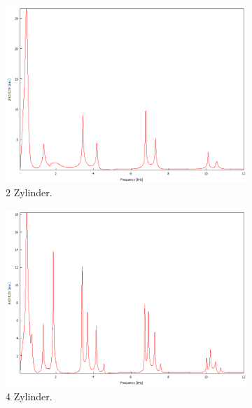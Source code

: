 \begin{figure}
    \centering
    \begin{subfigure}[b]{0.3\textwidth}
        \centering
        \includegraphics[width=\textwidth]{data/4_2/13mm_2zylinder.png}
        \caption{2 Zylinder.}
    \end{subfigure}
    \hfill
    \begin{subfigure}[b]{0.3\textwidth}
        \centering
        \includegraphics[width=\textwidth]{data/4_2/13mm_4zylinder.png}
        \caption{4 Zylinder.}
    \end{subfigure}
    \hfill
    \begin{subfigure}[b]{0.3\textwidth}
        \centering

\end{subfigure}
\end{figure}
